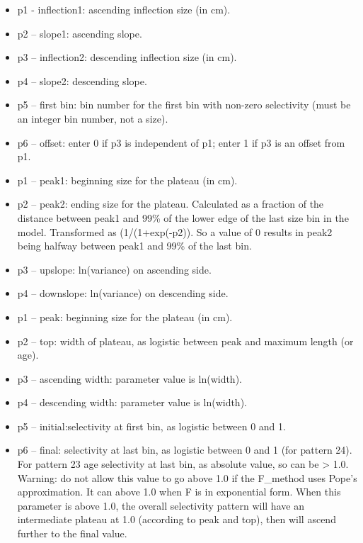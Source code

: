 	\begin{itemize}
		\item p1 - inflection1:  ascending inflection size (in cm).
		\item p2 – slope1:  ascending slope.
		\item p3 – inflection2:  descending inflection size (in cm).
		\item p4 – slope2:  descending slope.
		\item p5 – first bin: bin number for the first bin with non-zero selectivity (must be an integer bin number, not a size).
		\item p6 – offset:  enter 0 if p3 is independent of p1; enter 1 if p3 is an offset from p1.
	\end{itemize}

	\begin{itemize}
		\item p1 – peak1: beginning size for the plateau (in cm).
		\item p2 – peak2: ending size for the plateau.  Calculated as a fraction of the distance between peak1 and 99\% of the lower edge of the last size bin in the model.  Transformed as (1/(1+exp(-p2)). So a value of 0 results in peak2 being halfway between peak1 and 99\% of the last bin.
		\item p3 – upslope: ln(variance) on ascending side.
		\item p4 – downslope:  ln(variance) on descending side.
	\end{itemize}

	\begin{itemize}
		\item p1 – peak: beginning size for the plateau (in cm).
		\item p2 – top: width of plateau, as logistic between peak and maximum length (or age).
		\item p3 – ascending width:  parameter value is ln(width).
		\item p4 – descending width:  parameter value is ln(width).
		\item p5 – initial:selectivity at first bin, as logistic between 0 and 1.
		\item p6 – final: selectivity at last bin, as logistic between 0 and 1 (for pattern 24). For pattern 23 age selectivity at last bin, as absolute value, so can be > 1.0. Warning: do not allow this value to go above 1.0 if the F\_method uses Pope’s approximation. It can above 1.0 when F is in exponential form.  When this parameter is above 1.0, the overall selectivity pattern will have an intermediate plateau at 1.0 (according to peak and top), then will ascend further to the final value.
	\end{itemize}
	
